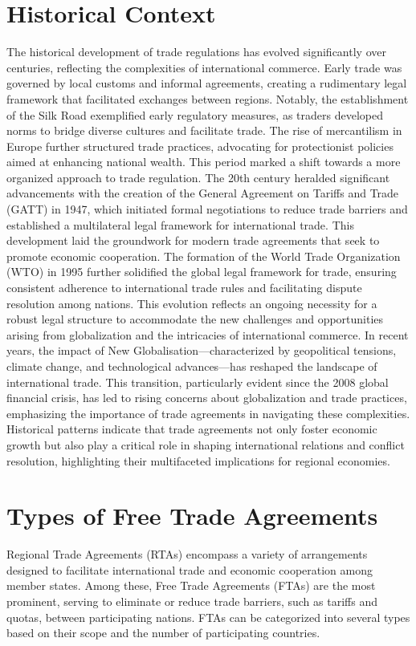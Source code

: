 \documentclass[12pt]{article}
\begin{document}
\section{Historical Context}
The historical development of trade regulations has evolved significantly over centuries, reflecting the complexities of international commerce. Early trade was governed by local customs and informal agreements, creating a rudimentary legal framework that facilitated exchanges between regions. Notably, the establishment of the Silk Road exemplified early regulatory measures, as traders developed norms to bridge diverse cultures and facilitate trade. The rise of mercantilism in Europe further structured trade practices, advocating for protectionist policies aimed at enhancing national wealth. This period marked a shift towards a more organized approach to trade regulation. The 20th century heralded significant advancements with the creation of the General Agreement on Tariffs and Trade (GATT) in 1947, which initiated formal negotiations to reduce trade barriers and established a multilateral legal framework for international trade. This development laid the groundwork for modern trade agreements that seek to promote economic cooperation. The formation of the World Trade Organization (WTO) in 1995 further solidified the global legal framework for trade, ensuring consistent adherence to international trade rules and facilitating dispute resolution among nations. This evolution reflects an ongoing necessity for a robust legal structure to accommodate the new challenges and opportunities arising from globalization and the intricacies of international commerce.  In recent years, the impact of New Globalisation—characterized by geopolitical tensions, climate change, and technological advances—has reshaped the landscape of international trade. This transition, particularly evident since the 2008 global financial crisis, has led to rising concerns about globalization and trade practices, emphasizing the importance of trade agreements in navigating these complexities.  Historical patterns indicate that trade agreements not only foster economic growth but also play a critical role in shaping international relations and conflict resolution, highlighting their multifaceted implications for regional economies.



\section{Types of Free Trade Agreements}
Regional Trade Agreements (RTAs) encompass a variety of arrangements designed to facilitate international trade and economic cooperation among member states. Among these, Free Trade Agreements (FTAs) are the most prominent, serving to eliminate or reduce trade barriers, such as tariffs and quotas, between participating nations. FTAs can be categorized into several types based on their scope and the number of participating countries.
\end{document}
